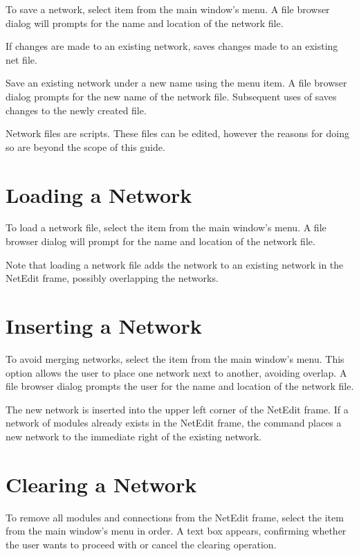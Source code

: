 To save a network, select  item from the main window's
 menu.  A file browser dialog will prompts for the
name and location of the network file.

If  changes are made to an existing network,   
saves changes made to an existing net file.

Save an existing network under a new name using the
 menu item.  A file browser dialog prompts
for the new name of the network file.  Subsequent uses of
 saves changes to the newly created file.

Network files are   scripts.
These files can be edited, however the reasons for doing so are beyond
the scope of this guide.

\section{Loading a Network}
\label{sec:opennet}

To load a network file, select the  item from the main
window's  menu.   A file browser dialog will prompt for the
name and location of the network file.

Note that loading a network file adds the network to an existing network in
the NetEdit frame, possibly overlapping the networks.

\section{Inserting a Network}
\label{sec:insertnetwork}

To avoid merging networks, select the
 item from the main window's  menu. This
option allows the user to place one \sr{} network next to another,
avoiding overlap.  A file browser dialog prompts the user for the name and
location of the network file.

The new network is inserted into the upper left corner of the
NetEdit frame.  If a network of modules already exists in the NetEdit
frame, the  command places a new network to the
immediate right of the existing network.

\section{Clearing a Network}
\label{sec:clearnetwork}

To remove all modules and connections from the 
NetEdit frame, select the  item from the main window's
 menu in order.  A text box appears, confirming whether the
user wants to proceed with or cancel the clearing operation.

